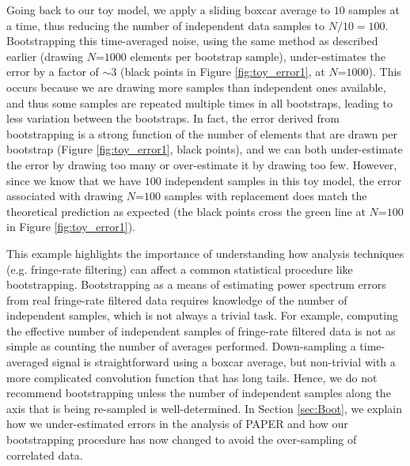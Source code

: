 \documentclass[preprint2,numberedappendix,tighten]{aastex6}
\begin{document}
Going back to our toy model, we apply a sliding boxcar average to $10$ samples at a time, thus reducing the number of 
independent data samples to $N/10 = 100$. Bootstrapping this time-averaged noise, using the same method as described 
earlier (drawing $N$=$1000$ elements per bootstrap sample), under-estimates the error by a factor of $\sim3$ (black points in Figure \ref{fig:toy_error1}, at $N$=$1000$). This occurs 
because we are drawing more samples than independent ones available, and thus some samples are repeated multiple times 
in all bootstraps, leading to less variation between the bootstraps. In fact, the error derived from bootstrapping is a strong 
function of the number of elements that are drawn per bootstrap (Figure \ref{fig:toy_error1}, black points), and we can both 
under-estimate the error by drawing too many or over-estimate it by drawing too few. However, since we know that we have $100$ 
independent samples in this toy model, the error associated with drawing $N$=$100$ samples with replacement does match the theoretical prediction 
as expected (the black points cross the green line at $N$=$100$ in Figure \ref{fig:toy_error1}).

This example highlights the importance of understanding how analysis techniques (e.g. fringe-rate filtering) can affect a 
common statistical procedure like bootstrapping. Bootstrapping as a means of estimating power spectrum errors from real 
fringe-rate filtered data requires knowledge of the number of independent samples, which is not always a trivial task. For 
example, computing the effective number of independent samples of fringe-rate filtered data is not as simple as counting the 
number of averages performed. Down-sampling a time-averaged signal is straightforward using a boxcar average, but non-trivial with a more complicated convolution function that has long tails. Hence, we do not recommend bootstrapping unless the 
number of independent samples along the axis that is being re-sampled is well-determined. In Section \ref{sec:Boot}, we explain how we under-estimated errors in the  analysis of PAPER and how our bootstrapping procedure has now changed to avoid the over-sampling of correlated data. 
\end{document}

